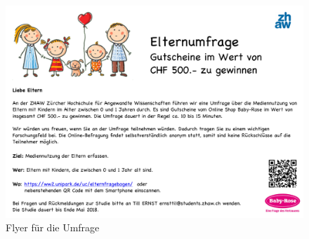 \begin{figure}[h]
  \centering
     \includegraphics[scale=0.9,angle=90]{content/Grafik/Flyer_Umfrage_v2.pdf}
  \caption{Flyer für die Umfrage}
  \label{fig:flyer}
\end{figure}